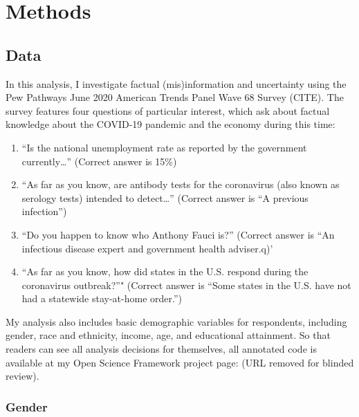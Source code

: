 \documentclass[11pt]{article}
\begin{document}
\hypertarget{methods}{%
\section{Methods}\label{sec:methods}}

\hypertarget{data}{%
\subsection{Data}\label{sec:data}}

In this analysis, I investigate factual (mis)information and uncertainty using the Pew Pathways June 2020 American Trends Panel Wave 68 Survey (CITE). The survey features four questions of particular interest, which ask about factual knowledge about the COVID-19 pandemic and the economy during this time:

\begin{enumerate}
\def\labelenumi{(\arabic{enumi})}
  \item ``Is the national unemployment rate as reported by the government currently…'' (Correct answer is 15\%)
  \item ``As far as you know, are antibody tests for the coronavirus (also known as serology tests) intended to detect…'' (Correct answer is ``A previous infection'')
  \item ``Do you happen to know who Anthony Fauci is?'' (Correct answer is ``An infectious disease expert and government health adviser.q)'
  \item ``As far as you know, how did states in the U.S. respond during the coronavirus outbreak?''" (Correct answer is ``Some states in the U.S. have not had a statewide stay-at-home order.'')
\end{enumerate}

My analysis also includes basic demographic variables for respondents, including gender, race and ethnicity, income, age, and educational attainment. So that readers can see all analysis decisions for themselves, all annotated code is available at my Open Science Framework project page: (URL removed for blinded review).


\hypertarget{gender}{%
\subsubsection{Gender}\label{sec:gender}}
\end{document}
